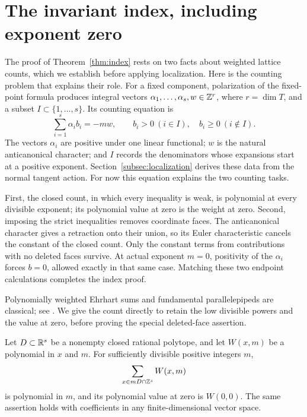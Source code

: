 \section{The invariant index, including exponent zero}
\label{sec:index}

The proof of Theorem~\ref{thm:index} rests on two facts about weighted
lattice counts, which we establish before applying localization.
Here is the counting problem that explains their role. For a fixed
component, polarization of the fixed-point formula produces integral vectors
\(\alpha_1,\ldots,\alpha_s,w\in\mathbb Z^r\), where \(r=\dim T\), and a subset
\(I\subset\{1,\ldots,s\}\). Its counting equation is
\[
\sum_{i=1}^s\alpha_i b_i=-mw,
\qquad b_i>0\ (i\in I),\quad b_i\ge0\ (i\notin I).
\]
The vectors \(\alpha_i\) are positive under one linear functional;
\(w\) is the natural anticanonical character; and \(I\) records
the denominators whose expansions
start at a positive exponent. Section~\ref{subsec:localization} derives
these data from the normal tangent action. For now this equation explains
the two counting tasks.

First, the closed count, in which every inequality is weak, is polynomial
at every divisible exponent; its polynomial value at zero is the weight
at zero. Second, imposing the strict inequalities removes coordinate
faces. The anticanonical character gives a retraction onto their union,
so its Euler characteristic cancels the constant of the closed count.
Only the constant terms from contributions with no deleted faces survive.
At actual exponent
\(m=0\), positivity of the \(\alpha_i\) forces \(b=0\), allowed
exactly in that same case. Matching these two endpoint calculations
completes the index proof.

Polynomially weighted Ehrhart sums and fundamental parallelepipeds are
classical; see
\cite[preprint \S2.4 and \S3.1]{BaldoniBerlineDeLoeraKoeppeVergne2012}.
We give the count directly to retain the low divisible powers and the
value at zero, before proving the special deleted-face assertion.

\begin{lemma}\label{lem:ehrhart}
Let \(D\subset\mathbb R^s\) be a nonempty closed rational polytope, and
let \(W(x,m)\) be a polynomial in \(x\) and \(m\).
For sufficiently divisible positive integers \(m\),
\[
\sum_{x\in mD\cap\mathbb Z^s}W(x,m)
\]
is polynomial in \(m\), and its polynomial value at zero is \(W(0,0)\).
The same assertion holds with coefficients in any finite-dimensional
vector space.
\end{lemma}

